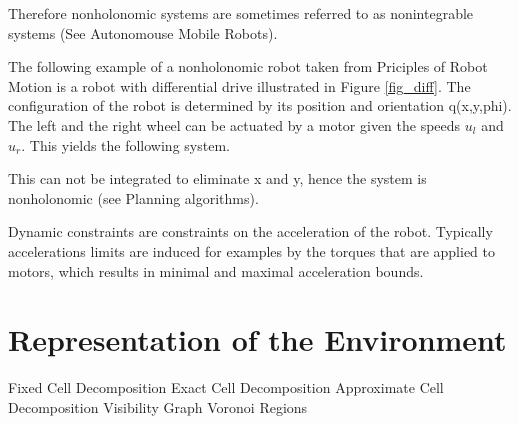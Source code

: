 Therefore nonholonomic systems are sometimes referred to as nonintegrable systems (See Autonomouse Mobile Robots).


The following example of a nonholonomic robot taken from Priciples of Robot Motion is a robot with differential drive illustrated in Figure \ref{fig_diff}.
The configuration of the robot is determined by its position and orientation q(x,y,phi).
The left and the right wheel can be actuated by a motor given the speeds $u_l$ and $u_r$.
This yields the following system.

This can not be integrated to eliminate x and y, hence the system is nonholonomic (see Planning algorithms).
  
Dynamic constraints are constraints on the acceleration of the robot.  Typically accelerations limits are induced for examples by the torques that are applied to motors, which results in minimal and maximal acceleration bounds.


\section{Representation of the Environment}\label{sec:representation}
Fixed Cell Decomposition
Exact Cell Decomposition
Approximate Cell Decomposition
Visibility Graph
Voronoi Regions

